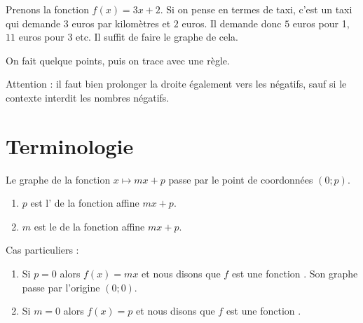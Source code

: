 \begin{example}
    \begin{figure}
   \vspace{-0.5cm}        %
   \centering
   
\end{figure}

    Prenons la fonction \( f(x)=3x+2\). Si on pense en termes de taxi, c'est un taxi qui demande \( 3\) euros par kilomètres et \( 2\) euros. Il demande donc \( 5\) euros pour \unit{1}{\kilo\meter}, \( 11\) euros pour \unit{3}{\kilo\meter} etc. Il suffit de faire le graphe de cela. 


    On fait quelque points, puis on trace avec une règle.

    Attention : il faut bien prolonger la droite également vers les négatifs, sauf si le contexte interdit les nombres négatifs.
    
\end{example}

\section{Terminologie}

\begin{Aretenir}
    Le graphe de la fonction \( x\mapsto mx+p\) passe par le point de coordonnées \( (0;p)\).
    \begin{enumerate}
        \item
            \( p\) est l' de la fonction affine \( mx+p\).
        \item
            \( m\) est le  de la fonction affine \( mx+p\).
    \end{enumerate}
\end{Aretenir}

Cas particuliers :
\begin{enumerate}
    \item
        Si \( p=0\) alors \( f(x)=mx\) et nous disons que \( f\) est une fonction . Son graphe passe par l'origine \( (0;0)\).
    \item
        Si \( m=0\) alors \( f(x)=p\) et nous disons que \( f\) est une fonction .
\end{enumerate}

